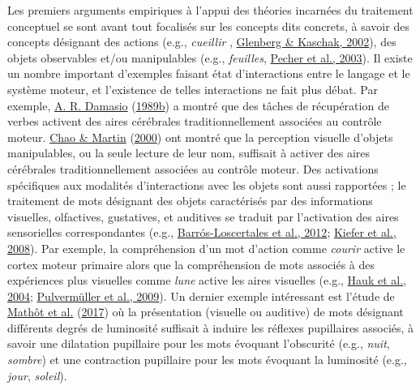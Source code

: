 \documentclass[
  a4paper,12pt,twoside,onecolumn,openright,final,oldfontcommands]{memoir}
\begin{document}
Les premiers arguments empiriques à l'appui des théories incarnées du traitement conceptuel se sont avant tout focalisés sur les concepts dits concrets, à savoir des concepts désignant des actions (e.g., \emph{cueillir} , \protect\hyperlink{ref-glenberg_grounding_2002}{Glenberg \& Kaschak, 2002}), des objets observables et/ou manipulables (e.g., \emph{feuilles}, \protect\hyperlink{ref-pecher_verifying_2003}{Pecher et al., 2003}). Il existe un nombre important d'exemples faisant état d'interactions entre le langage et le système moteur, et l'existence de telles interactions ne fait plus débat. Par exemple, \protect\hyperlink{ref-damasio_time-locked_1989}{A. R. Damasio} (\protect\hyperlink{ref-damasio_time-locked_1989}{1989b}) a montré que des tâches de récupération de verbes activent des aires cérébrales traditionnellement associées au contrôle moteur. \protect\hyperlink{ref-chao_representation_2000}{Chao \& Martin} (\protect\hyperlink{ref-chao_representation_2000}{2000}) ont montré que la perception visuelle d'objets manipulables, ou la seule lecture de leur nom, suffisait à activer des aires cérébrales traditionnellement associées au contrôle moteur. Des activations spécifiques aux modalités d'interactions avec les objets sont aussi rapportées ; le traitement de mots désignant des objets caractérisés par des informations visuelles, olfactives, gustatives, et auditives se traduit par l'activation des aires sensorielles correspondantes (e.g., \protect\hyperlink{ref-barros-loscertales_reading_2012}{Barrós-Loscertales et al., 2012}; \protect\hyperlink{ref-kiefer_sound_2008}{Kiefer et al., 2008}). Par exemple, la compréhension d'un mot d'action comme \emph{courir} active le cortex moteur primaire alors que la compréhension de mots associés à des expériences plus visuelles comme \emph{lune} active les aires visuelles (e.g., \protect\hyperlink{ref-hauk_somatotopic_2004}{Hauk et al., 2004}; \protect\hyperlink{ref-pulvermuller_distributed_2009}{Pulvermüller et al., 2009}). Un dernier exemple intéressant est l'étude de \protect\hyperlink{ref-mathot_pupillary_2017}{Mathôt et al.} (\protect\hyperlink{ref-mathot_pupillary_2017}{2017}) où la présentation (visuelle ou auditive) de mots désignant différents degrés de luminosité suffisait à induire les réflexes pupillaires associés, à savoir une dilatation pupillaire pour les mots évoquant l'obscurité (e.g., \emph{nuit}, \emph{sombre}) et une contraction pupillaire pour les mots évoquant la luminosité (e.g., \emph{jour}, \emph{soleil}).
\end{document}
